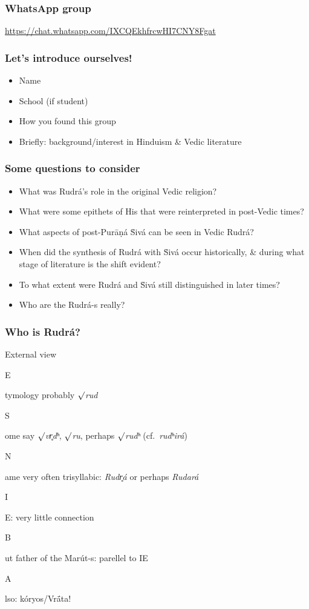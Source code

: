 \documentclass[pdf]{beamer}
\newcommand{\Subitem}[1]{{\setlength\itemindent{12pt} \item[-] #1}}
\newcommand{\Subsubitem}[1]{{\setlength\itemindent{24pt} \item[○] #1}}
\begin{document}
\begin{frame} \frametitle{WhatsApp group}
\begin{center}
	\href{https://chat.whatsapp.com/IXCQEkhfrcwHI7CNY8Fgat}{https://chat.whatsapp.com/IXCQEkhfrcwHI7CNY8Fgat}
\end{center}
\end{frame}

\begin{frame} \frametitle{Let's introduce ourselves!}
\begin{itemize}
	\item Name
	\item School (if student)
	\item How you found this group
	\item Briefly: background/interest in Hinduism \& Vedic literature
\end{itemize}
\end{frame}

\begin{frame}[label=questions] \frametitle{Some questions to consider}
\begin{itemize}
	\item What was Rudrá's role in the original Vedic religion?
	\item What were some epithets of His that were reinterpreted in post-Vedic times?
	\item What aspects of post-Purāṇá Ṡivá can be seen in Vedic Rudrá?
	\item When did the synthesis of Rudrá with Ṡivá occur historically, \& during what stage of literature is the shift evident?
	\item To what extent were Rudrá and Ṡivá still distinguished in later times?
	\item Who are the Rudrá-s really?
\end{itemize}
\end{frame}

\begin{frame} \frametitle{Who is Rudrá?}
\begin{itemize}
	\item External view
	\Subitem Etymology probably $\surd$\textit{rud}
	\Subsubitem Some say $\surd$\textit{vr̥dʰ}, $\surd$\textit{ru}, perhaps $\surd$\textit{rudʰ} (cf.~\textit{rudʰirá})
	\Subitem Name very often trisyllabic: \textit{Rudr̥á} or perhaps \textit{Rudará}
	\Subitem IE: very little connection
	\Subsubitem But father of the Marút-s: parellel to IE
	\Subsubitem Also: kóryos/Vrā́ta!
\end{itemize}
\end{frame}
\end{document}
